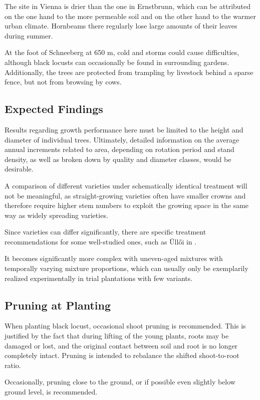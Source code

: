 The site in Vienna is drier than the one in Ernstbrunn, which can be attributed on the one hand to the more permeable soil and on the other hand to the warmer urban climate. Hornbeams there regularly lose large amounts of their leaves during summer.

At the foot of Schneeberg at 650 m, cold and storms could cause difficulties, although black locusts can occasionally be found in surrounding gardens. Additionally, the trees are protected from trampling by livestock behind a sparse fence, but not from browsing by cows.

\subsection{Expected Findings}

Results regarding growth performance here must be limited to the height and diameter of individual trees. Ultimately, detailed information on the average annual increments related to area, depending on rotation period and stand density, as well as broken down by quality and diameter classes, would be desirable.

A comparison of different varieties under schematically identical treatment will not be meaningful, as straight-growing varieties often have smaller crowns \citep{bujtas1984robinie} and therefore require higher stem numbers \citep{keresztesi1974robinie} to exploit the growing space in the same way as widely spreading varieties.

Since varieties can differ significantly, there are specific treatment recommendations for some well-studied ones, such as Üllői in \citet{redei2020ulloi}.

It becomes significantly more complex with uneven-aged mixtures with temporally varying mixture proportions, which can usually only be exemplarily realized experimentally in trial plantations with few variants.

\subsection{Pruning at Planting}

When planting black locust, occasional shoot pruning is recommended. This is justified by the fact that during lifting of the young plants, roots may be damaged or lost, and the original contact between soil and root is no longer completely intact. Pruning is intended to rebalance the shifted shoot-to-root ratio.

Occasionally, pruning close to the ground, or if possible even slightly below ground level, is recommended.

